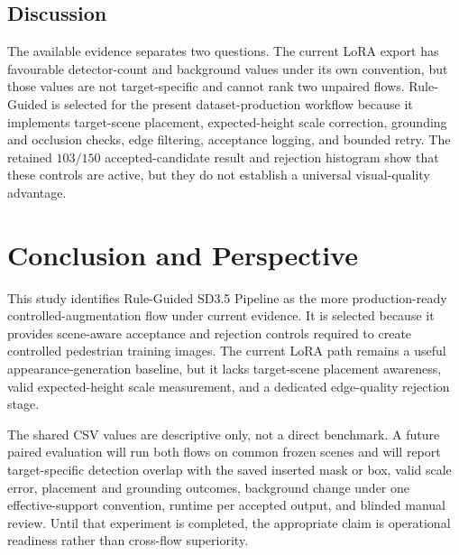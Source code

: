 \documentclass[11pt,a4paper]{article}
\begin{document}
\subsection{Discussion}\label{sec:discussion}
The available evidence separates two questions. The current LoRA export has favourable detector-count and background values under its own convention, but those values are not target-specific and cannot rank two unpaired flows. Rule-Guided is selected for the present dataset-production workflow because it implements target-scene placement, expected-height scale correction, grounding and occlusion checks, edge filtering, acceptance logging, and bounded retry. The retained $103/150$ accepted-candidate result and rejection histogram show that these controls are active, but they do not establish a universal visual-quality advantage.

\section{Conclusion and Perspective}\label{sec:conclusion}
This study identifies Rule-Guided SD3.5 Pipeline as the more production-ready controlled-augmentation flow under current evidence. It is selected because it provides scene-aware acceptance and rejection controls required to create controlled pedestrian training images. The current LoRA path remains a useful appearance-generation baseline, but it lacks target-scene placement awareness, valid expected-height scale measurement, and a dedicated edge-quality rejection stage.

The shared CSV values are descriptive only, not a direct benchmark. A future paired evaluation will run both flows on common frozen scenes and will report target-specific detection overlap with the saved inserted mask or box, valid scale error, placement and grounding outcomes, background change under one effective-support convention, runtime per accepted output, and blinded manual review. Until that experiment is completed, the appropriate claim is operational readiness rather than cross-flow superiority.
\end{document}

